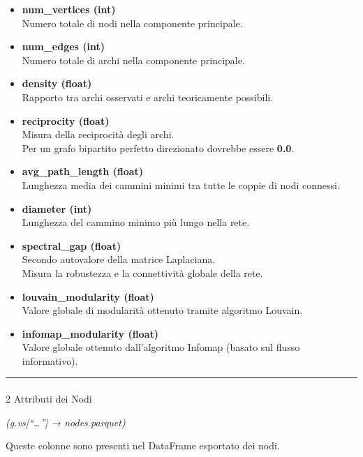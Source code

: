 \documentclass[
  italian,
  a4paper,
]{article}
\makeatletter
\let\oldparagraph\paragraph
\renewcommand{\paragraph}{
    \@ifstar
      \xxxParagraphStar
      \xxxParagraphNoStar
  }
\newcommand{\xxxParagraphStar}[1]{\oldparagraph*{#1}\mbox{}}
\newcommand{\xxxParagraphNoStar}[1]{\oldparagraph{#1}\mbox{}}
\makeatother
\begin{document}
\begin{itemize}
\item
  \textbf{num\_vertices (int)}\\
  Numero totale di nodi nella componente principale.
\item
  \textbf{num\_edges (int)}\\
  Numero totale di archi nella componente principale.
\item
  \textbf{density (float)}\\
  Rapporto tra archi osservati e archi teoricamente possibili.
\item
  \textbf{reciprocity (float)}\\
  Misura della reciprocità degli archi.\\
  Per un grafo bipartito perfetto direzionato dovrebbe essere
  \textbf{0.0}.
\item
  \textbf{avg\_path\_length (float)}\\
  Lunghezza media dei cammini minimi tra tutte le coppie di nodi
  connessi.
\item
  \textbf{diameter (int)}\\
  Lunghezza del cammino minimo più lungo nella rete.
\item
  \textbf{spectral\_gap (float)}\\
  Secondo autovalore della matrice Laplaciana.\\
  Misura la robustezza e la connettività globale della rete.
\item
  \textbf{louvain\_modularity (float)}\\
  Valore globale di modularità ottenuto tramite algoritmo Louvain.
\item
  \textbf{infomap\_modularity (float)}\\
  Valore globale ottenuto dall'algoritmo Infomap (basato sul flusso
  informativo).
\end{itemize}

\begin{center}\rule{0.5\linewidth}{0.5pt}\end{center}

\paragraph{2 Attributi dei Nodi}\label{attributi-dei-nodi}

\emph{(g.vs{[}``\ldots{}''{]} → nodes.parquet)}

Queste colonne sono presenti nel DataFrame esportato dei nodi.
\end{document}
